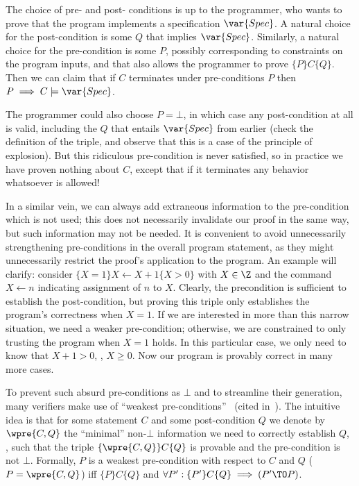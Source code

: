 The choice of pre- and post- conditions is up to the programmer, who wants to
prove that the program implements a specification \(\var{Spec}\). A natural
choice for the post-condition is some \(Q\) that implies \(\var{Spec}\).
Similarly, a natural choice for the pre-condition is some \(P\), possibly
corresponding to constraints on the program inputs, and that also allows the
programmer to prove \(\{P\} C \{Q\}\). Then we can claim that if \(C\)
terminates under pre-conditions \(P\) then \(P \implies C \models \var{Spec}\).

The programmer could also choose \(P = \bot\), in which case any post-condition
at all is valid, including the \(Q\) that entails \(\var{Spec}\) from earlier
(check the definition of the triple, and observe that this is a case of the
principle of explosion). But this ridiculous pre-condition is never satisfied,
so in practice we have proven nothing about \(C\), except that if it terminates
any behavior whatsoever is allowed!

In a similar vein, we can always add extraneous information to the pre-condition
which is not used; this does not necessarily invalidate our proof in the same
way, but such information may not be needed. It is convenient to avoid
unnecessarily strengthening pre-conditions in the overall program statement, as
they might unnecessarily restrict the proof's application to the program. An
example will clarify: consider \(\{X = 1\}X \gets X + 1\{X > 0\}\) with \(X \in
\Z\) and the command \(X \gets n\) indicating assignment of \(n\) to \(X\).
Clearly, the precondition is sufficient to establish the post-condition, but
proving this triple only establishes the program's correctness when \(X = 1\).
If we are interested in more than this narrow situation, we need a weaker
pre-condition; otherwise, we are constrained to only trusting the program when
\(X = 1\) holds. In this particular case, we only need to know that \(X + 1 >
0\), \ie, \(X \ge 0\). Now our program is provably correct in many more cases.

To prevent such absurd pre-conditions as \(\bot\) and to streamline their
generation, many verifiers make use of ``weakest
pre-conditions''~\cite{dijkstra1976discipline,Nelson_1989} (cited
in~\cite{leino2008specification}). The intuitive idea is that for some statement
\(C\) and some post-condition \(Q\) we denote by \(\wpre{C, Q}\) the ``minimal''
non-\(\bot\) information we need to correctly establish \(Q\), \ie, such that
the triple \(\{\wpre{C,Q}\} C \{Q\}\) is provable and the pre-condition is not
\(\bot\). Formally, \(P\) is a weakest pre-condition with respect to \(C\) and
\(Q\) (\(P = \wpre{C,Q}\)) iff \(\{P\} C \{Q\}\) and \(\forall P': \{P'\} C
\{Q\} \implies (P' \TO P)\).

